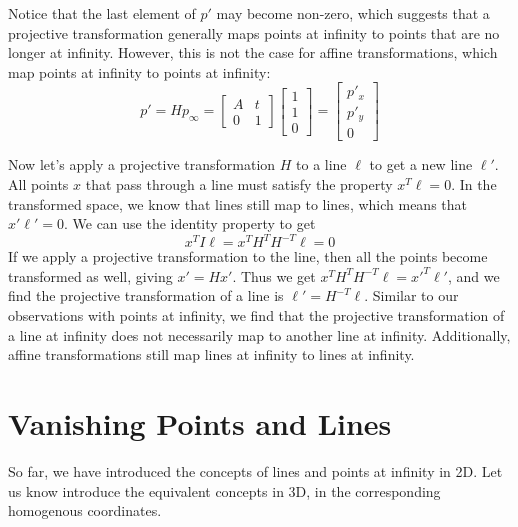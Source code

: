 \documentclass[a4paper, 12pt]{article}
\begin{document}
Notice that the last element of $p'$ may become non-zero, which suggests that a projective transformation generally maps points at infinity to points that are no longer at infinity. However, this is not the case for affine transformations, which map points at infinity to points at infinity:
\begin{equation}
p' =Hp_\infty = \begin{bmatrix} A &t \\ 0&1 \end{bmatrix}\begin{bmatrix}1\\1\\0\end{bmatrix} = \begin{bmatrix}p'_x\\ p'_y\\0\end{bmatrix}
\end{equation}

Now let's apply a projective transformation $H$ to a line $\ell$ to get a new line $\ell'$. All points $x$ that pass through a line must satisfy the property $x^T\ell = 0$. In the transformed space, we know that lines still map to lines, which means that $x'\ell' = 0$. We can use the identity property to get \[x^TI\ell = x^TH^T H^{-T} \ell = 0\]If we apply a projective transformation to the line, then all the points become transformed as well, giving $x' = Hx'$. Thus we get $x^TH^T H^{-T} \ell = x'^T\ell'$, and we find the projective transformation of a line is $\ell' = H^{-T}\ell$. Similar to our observations with points at infinity, we find that the projective transformation of a line at infinity does not necessarily map to another line at infinity. Additionally, affine transformations still map lines at infinity to lines at infinity.

\section{Vanishing Points and Lines}
So far, we have introduced the concepts of lines and points at infinity in 2D. Let us know introduce the equivalent concepts in 3D, in the corresponding homogenous coordinates. 
\end{document}
